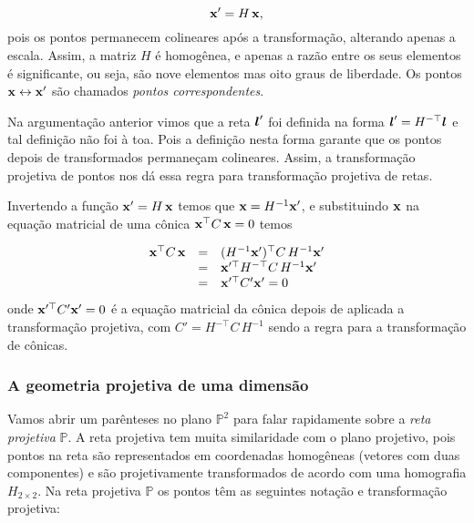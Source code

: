 \begin{equation*}
\mathbf{x}'=H\,\mathbf{x},
\end{equation*}
pois os pontos permanecem colineares após a transformação, alterando apenas a escala. Assim, a matriz $H$ é homogênea, e apenas a razão entre os seus elementos é significante, ou seja, são nove elementos mas oito graus de liberdade. Os pontos $\mathbf{x}\leftrightarrow\mathbf{x}'$ são chamados {\it pontos correspondentes}.\\


Na argumentação anterior vimos que a reta $\boldsymbol{l}'$ foi definida na forma $\boldsymbol{l}'=H^{-\top}\boldsymbol{l}$ e tal definição não foi à toa. Pois a definição nesta forma garante que os pontos depois de transformados permaneçam colineares. Assim, a transformação projetiva de pontos nos dá essa regra para transformação projetiva de retas.\\


Invertendo a função $\mathbf{x}'=H\,\mathbf{x}$ temos que $\mathbf{x}=H^{-1}\mathbf{x}'$, e substituindo $\mathbf{x}$ na equação matricial de uma cônica $\mathbf{x}^\top C\,\mathbf{x}=0$ temos

\begin{equation*}
\begin{array}{rcl}
\mathbf{x}^\top C\,\mathbf{x}&=&(H^{-1}\mathbf{x}')^\top C\,H^{-1}\mathbf{x}'\\
&=&\mathbf{x}'^\top H^{-\top}C\,H^{-1}\mathbf{x}'\\
&=&\mathbf{x}'^\top C'\mathbf{x}'=0
\end{array}
\end{equation*}
onde $\mathbf{x}'^\top C'\mathbf{x}'=0$ é a equação matricial da cônica depois de aplicada a transformação projetiva, com $C'=H^{-\top}C\,H^{-1}$ sendo a regra para a transformação de cônicas.


\subsubsection{A geometria projetiva de uma dimensão}\label{sec.geometria-1D}
Vamos abrir um parênteses no plano ${\mathbb{P}^2}$ para falar rapidamente sobre a {\it reta projetiva} ${\mathbb{P}}$. A reta projetiva tem muita similaridade com o plano projetivo, pois pontos na reta são representados em coordenadas homogêneas (vetores com duas componentes) e são projetivamente transformados de acordo com uma homografia $H_{2\times2}$. Na reta projetiva ${\mathbb{P}}$ os pontos têm as seguintes notação e transformação projetiva: 

